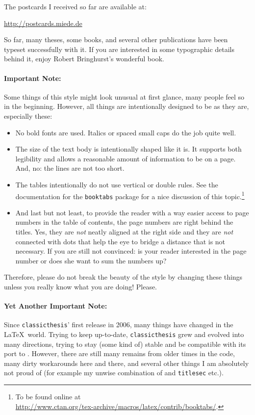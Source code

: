 \noindent The postcards I received so far are available at:
\begin{center}
 \url{http://postcards.miede.de}
\end{center}
 So far, many theses, some books, and several other publications have been typeset successfully with it. If you are interested in some typographic details behind it, enjoy Robert Bringhurst's wonderful book. %

\paragraph{Important Note:} Some things of this style might look unusual at first glance, many people feel so in the beginning. However, all things are intentionally designed to be as they are, especially these:
\begin{itemize}
\item No bold fonts are used. Italics or spaced small caps do the job quite well.
\item The size of the text body is intentionally shaped like it is. It supports both legibility and allows a reasonable amount of information to be on a page. And, no: the lines are not too short.
\item The tables intentionally do not use vertical or double rules. See the documentation for the \texttt{booktabs} package for a nice discussion of this topic.\footnote{To be found online at \\ \url{http://www.ctan.org/tex-archive/macros/latex/contrib/booktabs/}.}
\item And last but not least, to provide the reader with a way easier access to page numbers in the table of contents, the page numbers are right behind the titles. Yes, they are \emph{not} neatly aligned at the right side and they are \emph{not} connected with dots that help the eye to bridge a distance that is not necessary. If you are still not convinced: is your reader interested in the page number or does she want to sum the numbers up?
\end{itemize}

\noindent Therefore, please do not break the beauty of the style by changing these things unless you really know what you are doing! Please.

\paragraph{Yet Another Important Note:} Since \texttt{classicthesis}' first release in 2006, many things have changed in the \LaTeX\ world.  Trying to keep up-to-date, \texttt{classicthesis} grew and evolved into many directions, trying to stay (some kind of) stable and be compatible with its port to \mLyX. However, there are still many remains from older times in the code, many dirty workarounds here and there, and several other things I am absolutely not proud of (for example my unwise combination of  and \texttt{titlesec} etc.). 

